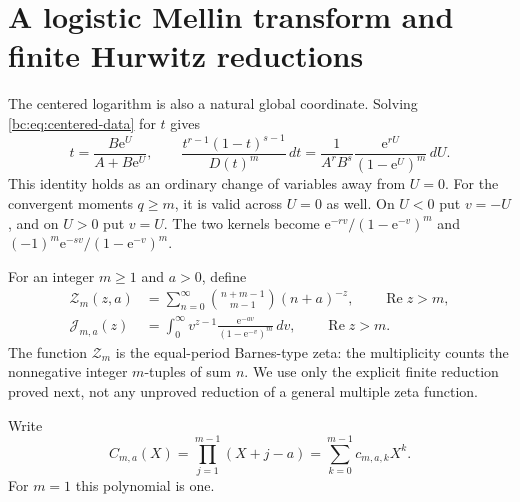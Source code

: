 \documentclass[11pt,letterpaper]{article}
\numberwithin{equation}{section}
\theoremstyle{definition}
\theoremstyle{remark}
\newcommand{\bcRe}{\operatorname{Re}}
\newcommand{\bcZ}{\mathcal Z}
\newcommand{\bcJ}{\mathcal J}
\newcommand{\bce}{\mathrm e}
\begin{document}
\section{A logistic Mellin transform and finite Hurwitz reductions}
\label{bc:sec:mellin}

The centered logarithm is also a natural global coordinate. Solving
\eqref{bc:eq:centered-data} for $t$ gives
\begin{equation}\label{bc:eq:logistic}
 t=\frac{B\bce^U}{A+B\bce^U},\qquad
 \frac{t^{r-1}(1-t)^{s-1}}{D(t)^m}\,dt
   =\frac1{A^rB^s}\frac{\bce^{rU}}{(1-\bce^U)^m}\,dU.
\end{equation}
This identity holds as an ordinary change of variables away from $U=0$.
For the convergent moments $q\ge m$, it is valid across $U=0$ as well.
On $U<0$ put $v=-U$, and on $U>0$ put $v=U$. The two kernels become
$\bce^{-rv}/(1-\bce^{-v})^m$ and
$(-1)^m\bce^{-sv}/(1-\bce^{-v})^m$.

For an integer $m\ge1$ and $a>0$, define
\begin{align}
 \bcZ_m(z,a)&=\sum_{n=0}^\infty
       \binom{n+m-1}{m-1}(n+a)^{-z},\qquad \bcRe z>m,
                  \label{bc:eq:barnes-series}\\
 \bcJ_{m,a}(z)&=\int_0^\infty
       v^{z-1}\frac{\bce^{-av}}{(1-\bce^{-v})^m}\,dv,
                  \qquad \bcRe z>m.
                  \label{bc:eq:mellin-J}
\end{align}
The function $\bcZ_m$ is the equal-period Barnes-type zeta: the
multiplicity counts the nonnegative integer $m$-tuples of sum $n$.
We use only the explicit finite reduction proved next, not any
unproved reduction of a general multiple zeta function.

Write
\begin{equation}\label{bc:eq:c-polynomial}
 C_{m,a}(X)=\prod_{j=1}^{m-1}(X+j-a)
                  =\sum_{k=0}^{m-1}c_{m,a,k}X^k.
\end{equation}
For $m=1$ this polynomial is one.
\end{document}
